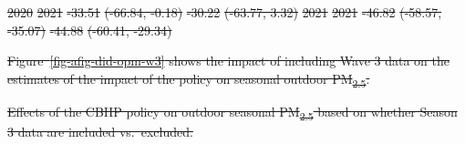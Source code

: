\documentclass[
  letterpaper,
  DIV=11,
  numbers=noendperiod]{scrartcl}
\makeatletter
\renewenvironment{figure}%
   {\renewcommand\familydefault\sfdefault
    \@float{figure}}
   {\end@float}
\providecommand{\DIFdeltex}[1]{{\protect\color{red}\sout{#1}}}                      %
\providecommand{\DIFdelFL}[1]{\DIFdel{#1}} %
\providecommand{\DIFdel}[1]{\texorpdfstring{\DIFdeltex{#1}}{}} %
\makeatother
\begin{document}
\DIFdelFL{2020 }%
\DIFdelFL{2021 }%
\DIFdelFL{-33.51 }%
\DIFdelFL{(-66.84, -0.18) }%
\DIFdelFL{-30.22 }%
\DIFdelFL{(-63.77, 3.32)}%
\DIFdelFL{2021 }%
\DIFdelFL{2021 }%
\DIFdelFL{-46.82 }%
\DIFdelFL{(-58.57, -35.07) }%
\DIFdelFL{-44.88 }%
\DIFdelFL{(-60.41, -29.34)}%

\DIFdel{Figure~\ref{fig-afig-did-opm-w3} shows the impact of including Wave 3
data on the estimates of the impact of the policy on seasonal outdoor
PM\textsubscript{2.5}.
}%




{%
\DIFdelFL{Effects of the CBHP policy on
outdoor seasonal PM\textsubscript{2.5} based on whether Season 3 data
are included vs.~excluded.}}





\end{document}
